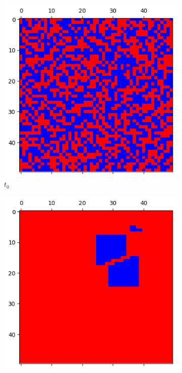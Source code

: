 \documentclass[letterpaper]{article}
\begin{document}

\begin{figure}
    \begin{subfigure}{.3\textwidth}
      \centering
      \includegraphics[width=1\linewidth]{images/assign2/visu_50-part1/t0}
      \caption{$t_0$}
      \label{fig:t0_50part1}
    \end{subfigure}
    \begin{subfigure}{.3\textwidth}
      \centering
      \includegraphics[width=1\linewidth]{images/assign2/visu_50-part1/t5}

\end{subfigure}
\end{figure}
\end{document}
